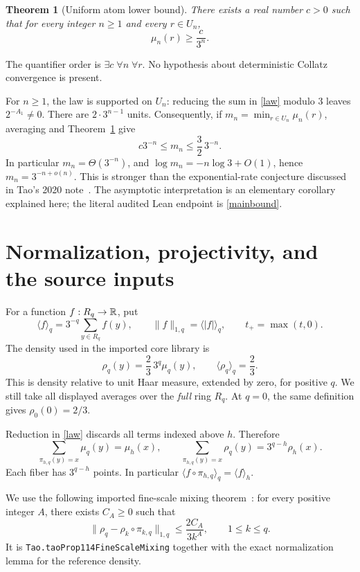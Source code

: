 \documentclass[11pt,a4paper]{article}
\newtheorem{theorem}{Theorem}[section]
\theoremstyle{definition}\newtheorem{definition}[theorem]{Definition}
\theoremstyle{remark}\newtheorem{remark}[theorem]{Remark}
\newcommand{\proj}[2]{\pi_{#1,#2}}
\newcommand{\av}[2]{\langle #2\rangle_{#1}}
\newcommand{\normone}[2]{\lVert #2\rVert_{1,#1}}
\newcommand{\code}[1]{{\small\nolinkurl{#1}}}
\begin{document}
\begin{theorem}[Uniform atom lower bound]\label{main}
There exists a real number $c>0$ such that for every integer $n\ge1$ and
every $r\in U_n$,
\begin{equation}\label{mainbound}
 \mu_n(r)\ge \frac{c}{3^n}.
\end{equation}
\end{theorem}
The quantifier order is $\exists c\;\forall n\;\forall r$. No hypothesis
about deterministic Collatz convergence is present.

For $n\ge1$, the law is supported on $U_n$: reducing the sum in
\eqref{law} modulo $3$ leaves $2^{-A_1}\ne0$. There are $2\cdot3^{n-1}$ units.
Consequently, if $m_n=\min_{r\in U_n}\mu_n(r)$, averaging and
Theorem~\ref{main} give
\begin{equation}\label{theta}
 c3^{-n}\le m_n\le\frac32\,3^{-n}.
\end{equation}
In particular $m_n=\Theta(3^{-n})$, and
$\log m_n=-n\log3+O(1)$, hence $m_n=3^{-n+o(n)}$.
This is stronger than the exponential-rate conjecture discussed in
Tao's 2020 note~\cite{tao2020}. The asymptotic interpretation is an elementary
corollary explained here; the literal audited Lean endpoint is
\eqref{mainbound}.

\section{Normalization, projectivity, and the source inputs}
For a function $f:R_q\to\mathbb R$, put
\[
 \av qf=3^{-q}\sum_{y\in R_q}f(y),\qquad
 \normone qf=\av q{|f|},\qquad t_+=\max(t,0).
\]
The density used in the imported core library is
\begin{equation}\label{rho}
 \rho_q(y)=\frac23\,3^q\mu_q(y),\qquad \av q{\rho_q}=\frac23.
\end{equation}
This is density relative to unit Haar measure, extended by zero, for
positive $q$. We still take all displayed averages over the \emph{full}
ring $R_q$. At $q=0$, the same definition gives $\rho_0(0)=2/3$.

Reduction in \eqref{law} discards all terms indexed above $h$. Therefore
\begin{equation}\label{projective}
 \sum_{\proj hq(y)=x}\mu_q(y)=\mu_h(x),\qquad
 \sum_{\proj hq(y)=x}\rho_q(y)=3^{q-h}\rho_h(x).
\end{equation}
Each fiber has $3^{q-h}$ points. In particular
$\av q{f\circ\proj hq}=\av hf$.

We use the following imported fine-scale mixing theorem~\cite{tao2019,mazur}:
for every positive integer $A$, there exists $C_A\ge0$ such that
\begin{equation}\label{mix}
 \normone q{\rho_q-\rho_k\circ\proj kq}
 \le \frac{2C_A}{3k^A},\qquad 1\le k\le q.
\end{equation}
It is \code{Tao.taoProp114FineScaleMixing} together with the exact
normalization lemma for the reference density.
\end{document}
